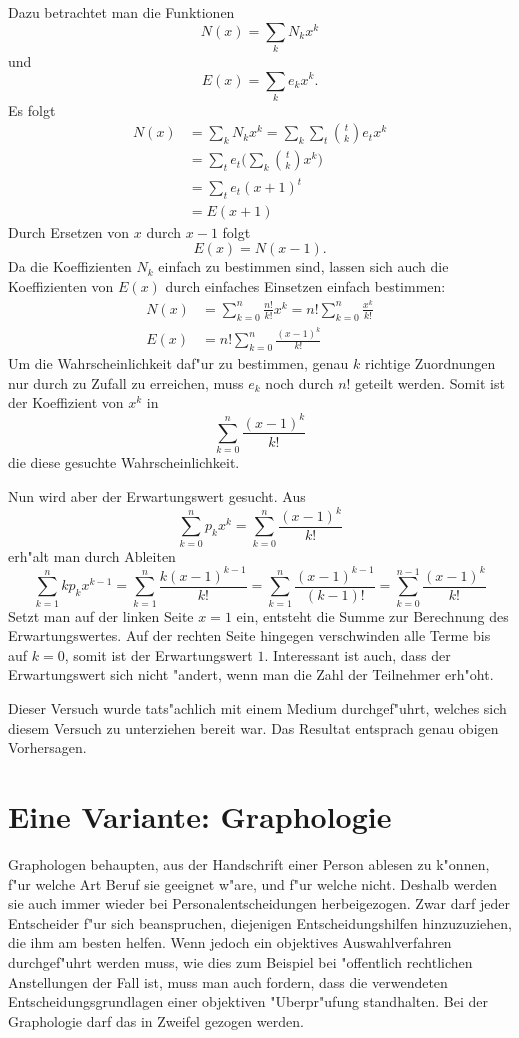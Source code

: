 Dazu betrachtet man die Funktionen
$$N(x)=\sum_{k}N_kx^k$$
und 
$$E(x)=\sum_{k}e_kx^k.$$
Es folgt
\begin{align*}
N(x)&=\sum_kN_kx^k=\sum_k\sum_t\binom{t}{k}e_tx^k\\
&=\sum_te_t\biggl(\sum_k\binom{t}{k}x^k\biggr)\\
&=\sum_te_t(x+1)^t\\
&=E(x+1)
\end{align*}
Durch Ersetzen von $x$ durch $x-1$ folgt
$$E(x)=N(x-1).$$
Da die Koeffizienten $N_k$ einfach zu bestimmen sind, lassen sich auch
die Koeffizienten von $E(x)$ durch einfaches Einsetzen einfach
bestimmen:
\begin{align*}
N(x)&=\sum_{k=0}^n\frac{n!}{k!}x^k=n!\sum_{k=0}^n\frac{x^k}{k!}\\
E(x)&=n!\sum_{k=0}^n\frac{(x-1)^k}{k!}
\end{align*}
Um die Wahrscheinlichkeit daf"ur zu bestimmen, genau $k$ richtige Zuordnungen nur
durch zu Zufall zu erreichen, muss $e_k$ noch durch $n!$ geteilt werden. Somit
ist der Koeffizient von $x^k$ in
$$\sum_{k=0}^n\frac{(x-1)^k}{k!}$$
die diese gesuchte Wahrscheinlichkeit.

Nun wird aber der Erwartungswert gesucht. Aus
$$\sum_{k=0}^np_kx^k=\sum_{k=0}^n\frac{(x-1)^k}{k!}$$
erh"alt man durch Ableiten
$$
\sum_{k=1}^nkp_kx^{k-1}
=\sum_{k=1}^n\frac{k(x-1)^{k-1}}{k!}
=\sum_{k=1}^n\frac{(x-1)^{k-1}}{(k-1)!}
=\sum_{k=0}^{n-1}\frac{(x-1)^k}{k!}
$$
Setzt man auf der linken Seite $x=1$ ein, entsteht die Summe zur
Berechnung des Erwartungswertes. Auf der rechten Seite hingegen
verschwinden alle Terme bis auf $k=0$, somit ist der Erwartungswert
$1$.
Interessant ist auch, dass der Erwartungswert sich nicht "andert,
wenn man die Zahl der Teilnehmer erh"oht.

Dieser Versuch wurde tats"achlich mit einem Medium durchgef"uhrt, welches
sich diesem Versuch zu unterziehen bereit war. Das Resultat entsprach genau
obigen Vorhersagen.

\section{Eine Variante: Graphologie}
Graphologen behaupten, aus der Handschrift einer Person ablesen zu k"onnen,
f"ur welche Art Beruf sie geeignet w"are, und f"ur welche nicht. Deshalb
werden sie auch immer wieder bei Personalentscheidungen herbeigezogen.
Zwar darf jeder Entscheider f"ur sich beanspruchen, diejenigen Entscheidungshilfen
hinzuzuziehen, die ihm am besten helfen. Wenn jedoch ein objektives
Auswahlverfahren durchgef"uhrt werden muss, wie dies zum Beispiel bei
"offentlich rechtlichen Anstellungen der Fall ist, muss man auch
fordern, dass die verwendeten Entscheidungsgrundlagen einer objektiven
"Uberpr"ufung standhalten. Bei der Graphologie darf das in Zweifel
gezogen werden.

